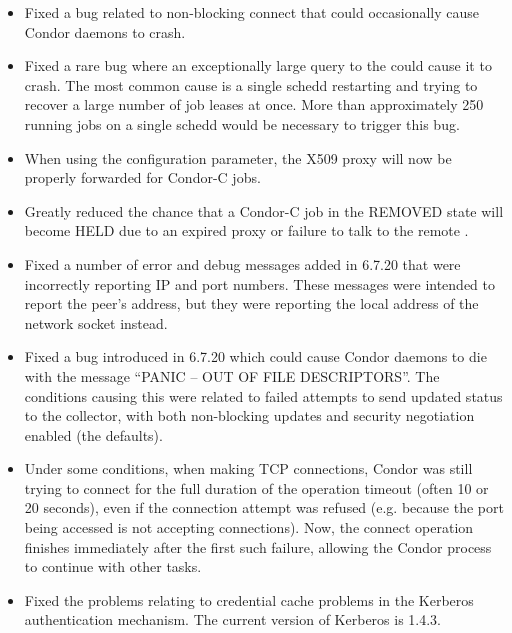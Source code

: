\begin{itemize}
\item Fixed a bug related to non-blocking connect that could occasionally
cause Condor daemons to crash.

\item Fixed a rare bug where an exceptionally large query to the
 could cause it to crash.  The most common cause is a single
schedd restarting and trying to recover a large number of job leases at once.
More than approximately 250 running jobs on a single schedd would be necessary
to trigger this bug.

\item When using the  configuration
parameter, the X509 proxy will now be properly forwarded for Condor-C jobs.

\item Greatly reduced the chance that a Condor-C job in the REMOVED state
will become HELD due to an expired proxy or failure to talk to the remote
.

\item Fixed a number of error and debug messages added in 6.7.20 that
were incorrectly reporting IP and port numbers.  These messages were
intended to report the peer's address, but they were reporting the
local address of the network socket instead.

\item Fixed a bug introduced in 6.7.20 which could cause Condor daemons to
die with the message ``PANIC -- OUT OF FILE DESCRIPTORS''.  The conditions
causing this were related to failed attempts to send updated status
to the collector, with both non-blocking updates and security negotiation
enabled (the defaults).

\item Under some conditions, when making TCP connections, Condor was
still trying to connect for the full duration of the operation timeout
(often 10 or 20 seconds), even if the connection attempt was refused
(e.g. because the port being accessed is not accepting connections).
Now, the connect operation finishes immediately after the first such
failure, allowing the Condor process to continue with other tasks.

\item Fixed the problems relating to credential cache problems in the Kerberos
authentication mechanism.  The current version of Kerberos is 1.4.3.


\end{itemize}
